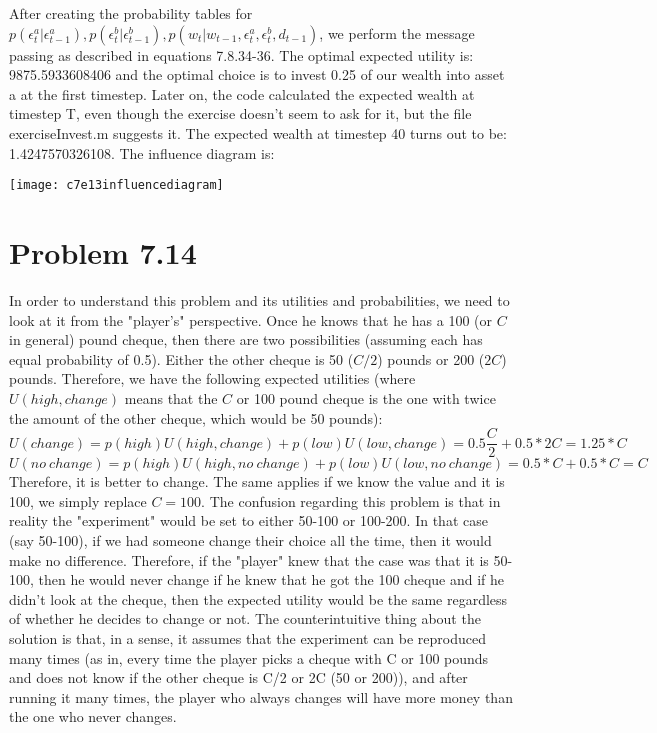 \documentclass[11pt,a4paper,oneside]{report}
\begin{document}
After creating the probability tables for $p(\epsilon_t^a|\epsilon_{t-1}^a),p(\epsilon_t^b|\epsilon_{t-1}^b),p(w_t|w_{t-1},\epsilon_t^a,\epsilon_t^b,d_{t-1})$, we perform the message passing as described in equations 7.8.34-36. The optimal expected utility is: 9875.5933608406 and the optimal choice is to invest 0.25 of our wealth into asset a at the first timestep. Later on, the code calculated the expected wealth at timestep T, even though the exercise doesn't seem to ask for it, but the file exerciseInvest.m suggests it. The expected wealth at timestep 40 turns out to be: 1.4247570326108. The influence diagram is:\\
	\begin{center} \texttt{[image: c7e13influencediagram]}\end{center}
	
\section*{Problem 7.14}
In order to understand this problem and its utilities and probabilities, we need to look at it from the "player's" perspective. Once he knows that he has a 100 (or $C$ in general) pound cheque, then there are two possibilities (assuming each has equal probability of 0.5). Either the other cheque is 50 ($C/2$) pounds or 200 ($2C$) pounds. Therefore, we have the following expected utilities (where $U(high,change)$ means that the $C$ or 100 pound cheque is the one with twice the amount of the other cheque, which would be 50 pounds):\\
$$U(change) = p(high)U(high,change) + p(low)U(low,change) = 0.5\frac{C}{2} + 0.5*2C = 1.25*C$$
$$U(no\ change) = p(high)U(high,no\ change) + p(low)U(low,no\ change) = 0.5*C + 0.5*C = C$$
Therefore, it is better to change. The same applies if we know the value and it is 100, we simply replace $C = 100$. The confusion regarding this problem is that in reality the "experiment" would be set to either 50-100 or 100-200. In that case (say 50-100), if we had someone change their choice all the time, then it would make no difference. Therefore, if the "player" knew that the case was that it is 50-100, then he would never change if he knew that he got the 100 cheque and if he didn't look at the cheque, then the expected utility would be the same regardless of whether he decides to change or not. The counterintuitive thing about the solution is that, in a sense, it assumes that the experiment can be reproduced many times (as in, every time the player picks a cheque with C or 100 pounds and does not know if the other cheque is C/2 or 2C (50 or 200)), and after running it many times, the player who always changes will have more money than the one who never changes.
\end{document}
